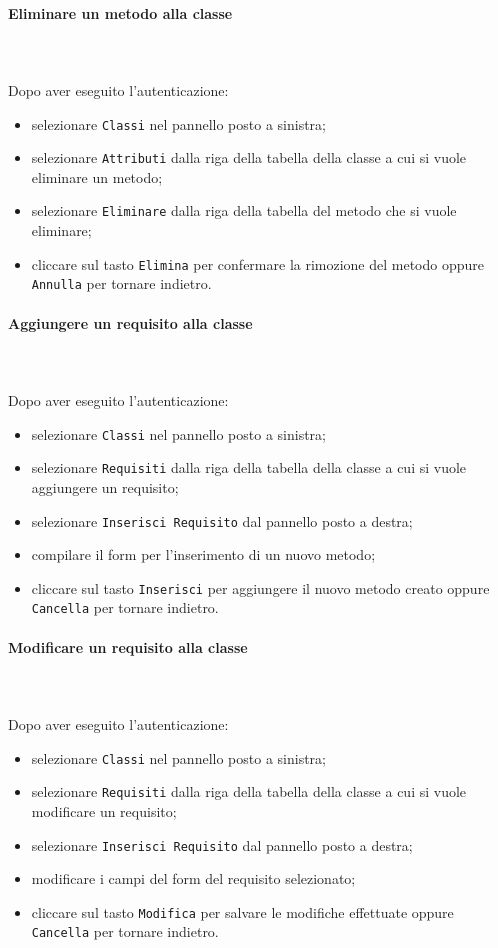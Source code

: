 \paragraph{Eliminare un metodo alla classe} \mbox{}\\ \mbox{}\\
Dopo aver eseguito l'autenticazione:
\begin{itemize}
	\item selezionare \texttt{Classi} nel pannello posto a sinistra;
	\item selezionare \texttt{Attributi} dalla riga della tabella della classe
		a cui si vuole eliminare un metodo;\
	\item selezionare \texttt{Eliminare} dalla riga della tabella del metodo
		che si vuole eliminare;
	\item cliccare sul tasto \texttt{Elimina} per confermare la rimozione del metodo
		oppure \texttt{Annulla} per tornare indietro.
\end{itemize}

\paragraph{Aggiungere un requisito alla classe} \mbox{}\\ \mbox{}\\
Dopo aver eseguito l'autenticazione:
\begin{itemize}
	\item selezionare \texttt{Classi} nel pannello posto a sinistra;
	\item selezionare \texttt{Requisiti} dalla riga della tabella della classe
		a cui si vuole aggiungere un requisito;
	\item selezionare \texttt{Inserisci Requisito} dal pannello posto a destra;
	\item compilare il form per l'inserimento di un nuovo metodo;
	\item cliccare sul tasto \texttt{Inserisci} per aggiungere il nuovo metodo 
		creato oppure \texttt{Cancella} per tornare indietro.	
\end{itemize}

\paragraph{Modificare un requisito alla classe} \mbox{}\\ \mbox{}\\
Dopo aver eseguito l'autenticazione:
\begin{itemize}
	\item selezionare \texttt{Classi} nel pannello posto a sinistra;
	\item selezionare \texttt{Requisiti} dalla riga della tabella della classe
		a cui si vuole modificare un requisito;
	\item selezionare \texttt{Inserisci Requisito} dal pannello posto a destra;
	\item modificare i campi del form del requisito selezionato;
	\item cliccare sul tasto \texttt{Modifica} per salvare le modifiche effettuate
		oppure \texttt{Cancella} per tornare indietro.
\end{itemize}

